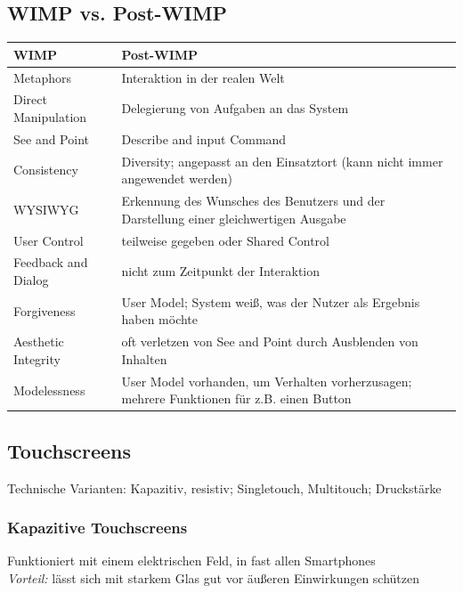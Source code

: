 \documentclass[8pt,a4paper,landscape]{extarticle}
\begin{document}
\begin{multicols*}{4}
	\subsection{WIMP vs. Post-WIMP}
	\begin{tabularx}{\linewidth}{|l|X|} \hline
		WIMP                & Post-WIMP                                                                                  \\\hline
		Metaphors           & Interaktion in der realen Welt                                                             \\\hline
		Direct Manipulation & Delegierung von Aufgaben an das System                                                     \\\hline
		See and Point       & Describe and input Command                                                                 \\\hline
		Consistency         & Diversity; angepasst an den Einsatztort (kann nicht immer angewendet werden)               \\\hline
		WYSIWYG             & Erkennung des Wunsches des Benutzers und der Darstellung einer gleichwertigen Ausgabe      \\\hline
		User Control        & teilweise gegeben oder Shared Control                                                      \\\hline
		Feedback and Dialog & nicht zum Zeitpunkt der Interaktion                                                        \\\hline
		Forgiveness         & User Model; System weiß, was der Nutzer als Ergebnis haben möchte                          \\\hline
		Aesthetic Integrity & oft verletzen von See and Point durch Ausblenden von Inhalten                              \\\hline
		Modelessness        & User Model vorhanden, um Verhalten vorherzusagen; mehrere Funktionen für z.B. einen Button \\\hline
	\end{tabularx}
	\subsection{Touchscreens}
	Technische Varianten: Kapazitiv, resistiv; Singletouch, Multitouch;
	Druckstärke
	\subsubsection{Kapazitive Touchscreens}
	Funktioniert mit einem elektrischen Feld, in fast allen Smartphones \\
	\textit{Vorteil:} lässt sich mit starkem Glas gut vor äußeren Einwirkungen
	schützen

\end{multicols*}
\end{document}
